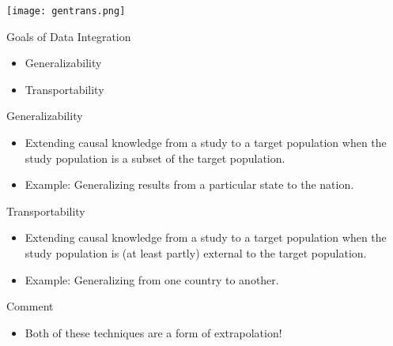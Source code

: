\documentclass[handout]{beamer} %
\begin{document}
\begin{frame}

  \begin{center}
    \texttt{[image: gentrans.png]}
  \end{center}

\end{frame}

\begin{frame}{Goals of Data Integration}

\begin{itemize}
    \item Generalizability
    \item Transportability
\end{itemize}

\end{frame}

\begin{frame}{Generalizability}

\begin{itemize}
    \item Extending causal knowledge from a study to a target population when
      the study population is a subset of the target population.
    \item Example: Generalizing results from a particular state to the nation.
\end{itemize}

\end{frame}

\begin{frame}{Transportability}

\begin{itemize}
    \item Extending causal knowledge from a study to a target population when
      the study population is (at least partly) external to the target
      population.
    \item Example: Generalizing from one country to another.
\end{itemize}

\end{frame}

\begin{frame}{Comment}

  \begin{itemize}
    \item Both of these techniques are a form of extrapolation!
  \end{itemize}

\end{frame}
\end{document}
